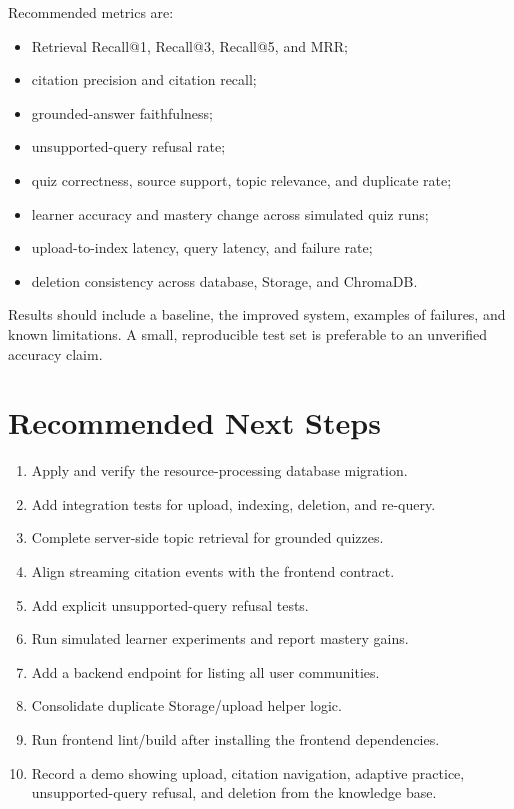 \documentclass[11pt,a4paper]{article}
\begin{document}
Recommended metrics are:

\begin{itemize}[leftmargin=*]
  \item Retrieval Recall@1, Recall@3, Recall@5, and MRR;
  \item citation precision and citation recall;
  \item grounded-answer faithfulness;
  \item unsupported-query refusal rate;
  \item quiz correctness, source support, topic relevance, and duplicate rate;
  \item learner accuracy and mastery change across simulated quiz runs;
  \item upload-to-index latency, query latency, and failure rate;
  \item deletion consistency across database, Storage, and ChromaDB.
\end{itemize}

Results should include a baseline, the improved system, examples of failures,
and known limitations. A small, reproducible test set is preferable to an
unverified accuracy claim.

\section{Recommended Next Steps}

\begin{enumerate}[leftmargin=*]
  \item Apply and verify the resource-processing database migration.
  \item Add integration tests for upload, indexing, deletion, and re-query.
  \item Complete server-side topic retrieval for grounded quizzes.
  \item Align streaming citation events with the frontend contract.
  \item Add explicit unsupported-query refusal tests.
  \item Run simulated learner experiments and report mastery gains.
  \item Add a backend endpoint for listing all user communities.
  \item Consolidate duplicate Storage/upload helper logic.
  \item Run frontend lint/build after installing the frontend dependencies.
  \item Record a demo showing upload, citation navigation, adaptive practice,
        unsupported-query refusal, and deletion from the knowledge base.
\end{enumerate}
\end{document}
